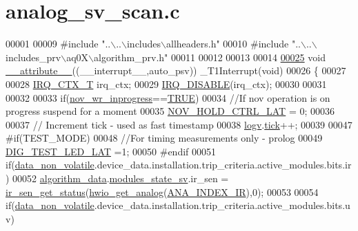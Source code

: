 \hypertarget{a00041_source}{\section{analog\+\_\+sv\+\_\+scan.\+c}
\label{a00041_source}
}

\begin{DoxyCode}
00001 
00009 \textcolor{preprocessor}{#include "..\(\backslash\)..\(\backslash\)includes\(\backslash\)allheaders.h"} 
00010 \textcolor{preprocessor}{#include "..\(\backslash\)..\(\backslash\)includes\_prv\(\backslash\)aq0X\(\backslash\)algorithm\_prv.h"}
00011 
00012 
00013 
00014 
\hypertarget{a00041_source_l00025}{}\hyperlink{a00041_a2068c3c2584547dbc1c8b9bca2d55b18}{00025} \textcolor{keywordtype}{void} \hyperlink{a00041_a2068c3c2584547dbc1c8b9bca2d55b18}{\_\_attribute\_\_}((\_\_interrupt\_\_,auto\_psv)) \_T1Interrupt(\textcolor{keywordtype}{void})
00026 \{
00027         
00028   \hyperlink{a00033_a6d4f0a7397640f5b011ca9c39d47dc72}{IRQ\_CTX\_T}   irq\_ctx;
00029   \hyperlink{a00033_a357168bbe78739811cdb7b5576714ca6}{IRQ\_DISABLE}(irq\_ctx);  
00030 
00031 
00032 
00033     \textcolor{keywordflow}{if}(\hyperlink{a00029_a56fe014653ebdce270aeac664bf86e65}{nov\_wr\_inprogress}==\hyperlink{a00040_aa8cecfc5c5c054d2875c03e77b7be15d}{TRUE})
00034         \textcolor{comment}{//If nov operation is on progress suspend for a moment}
00035         \hyperlink{a00029_aa03a6ff293decd7159ed1642ccbac971}{NOV\_HOLD\_CTRL\_LAT} = 0;
00036 
00037   \textcolor{comment}{// Increment tick - used as fast timestamp}
00038     \hyperlink{a00021_a2e89c46668b39a17753c238950c9e1ec}{logv}.\hyperlink{a00021_a81f0ce68c2c483fb8df726cc1988d8e8}{tick}++;
00039 
00047 \textcolor{preprocessor}{#if(TEST\_MODE)}
00048     \textcolor{comment}{//For timing measurements only - prolog}
00049     \hyperlink{a00058_a4c044f78fb8b7ee19bfdb5d2b204b50e}{DIG\_TEST\_LED\_LAT} =1;
00050 \textcolor{preprocessor}{#endif}
00051     \textcolor{keywordflow}{if}(\hyperlink{a00060_a76ac5f917f5308dcd83de0d7c94559fb}{data\_non\_volatile}.device\_data.installation.trip\_criteria.active\_modules.bits.ir)
00052          \hyperlink{a00016_a183caa40cd01e79ee309cc9c4a225197}{algorithm\_data}.\hyperlink{a00016_a293140e240bbd54f7601adbc9194148c}{modules\_state\_sv}.ir\_sen = 
      \hyperlink{a00017_a5bba51487aeccd791ff56017124da833}{ir\_sen\_get\_status}(\hyperlink{a00058_a5770775aca185380868838e69ec20215}{hwio\_get\_analog}(\hyperlink{a00058_a1fae4d2e8dd35f504ec4170044da7e73}{ANA\_INDEX\_IR}),0);
00053 
00054     \textcolor{keywordflow}{if}(\hyperlink{a00060_a76ac5f917f5308dcd83de0d7c94559fb}{data\_non\_volatile}.device\_data.installation.trip\_criteria.active\_modules.bits.uv)

\end{DoxyCode}
